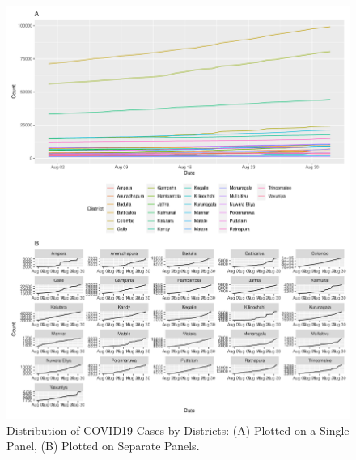 \documentclass[
]{article}
\begin{document}
\begin{figure}
\centering
\includegraphics{manuscript_covid19dashboard_files/figure-latex/unnamed-chunk-2-1.pdf}
\caption{Distribution of COVID19 Cases by Districts: (A) Plotted on a
Single Panel, (B) Plotted on Separate Panels.}
\end{figure}
\end{document}

